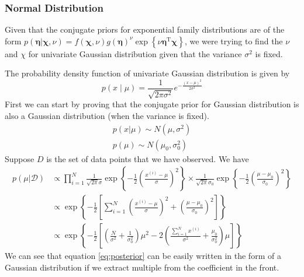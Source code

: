 \documentclass[12pt]{article}
\begin{document}
\subsubsection{Normal Distribution}
Given that the conjugate priors for exponential family distributions are of the form $p(\boldsymbol{\eta} | \boldsymbol{\chi}, \nu)=f(\boldsymbol{\chi}, \nu) g(\boldsymbol{\eta})^{\nu} \exp \left\{\nu \boldsymbol{\eta}^{\mathrm{T}} \boldsymbol{\chi}\right\}$, we were trying to find the $\nu$ and $\chi$ for univariate Gaussian distribution given that the variance $\sigma^2$ is fixed.

The probability density function of univariate Gaussian distribution is given by
\begin{equation}\label{eq:gaussian}
    p(x\mid\mu)=\frac{1}{\sqrt{2 \pi \sigma^{2}}} e^{-\frac{(x-\mu)^{2}}{2 \sigma^{2}}}
\end{equation}
First we can start by proving that the conjugate prior for Gaussian distribution is also a Gaussian distribution (when the variance is fixed).
\begin{displaymath}
\begin{array}{l}{p(x | \mu) \sim N\left(\mu, \sigma^{2}\right)} \\ {p(\mu) \sim N\left(\mu_{0}, \sigma_{0}^{2}\right)}\end{array}
\end{displaymath}
Suppose $D$ is the set of data points that we have observed. We have 
\begin{equation}\label{eq:posterior}
\begin{aligned} p(\mu | \mathcal{D}) &\propto  \prod_{i=1}^{N} \frac{1}{\sqrt{2 \pi} \sigma} \exp \left\{-\frac{1}{2}\left(\frac{x^{(i)}-\mu}{\sigma}\right)^{2}\right\} \times \frac{1}{\sqrt{2 \pi} \sigma_{0}} \exp \left\{-\frac{1}{2}\left(\frac{\mu-\mu_{0}}{\sigma_{0}}\right)^{2}\right\} \\ &\propto \exp \left\{-\frac{1}{2}\left[\sum_{i=1}^{N}\left(\frac{x^{(i)}-\mu}{\sigma}\right)^{2}+\left(\frac{\mu-\mu_{0}}{\sigma_{0}}\right)^{2}\right]\right\} \\ &\propto \exp \left\{-\frac{1}{2}\left[\left(\frac{N}{\sigma^{2}}+\frac{1}{\sigma_{0}^{2}}\right) \mu^{2}-2\left(\frac{\sum_{i=1}^{N} x^{(i)}}{\sigma^{2}}+\frac{\mu_{0}}{\sigma_{0}^{2}}\right) \mu\right]\right\} \end{aligned}
\end{equation}
We can see that equation \ref{eq:posterior} can be easily written in the form of a Gaussian distribution if we extract multiple from the coefficient in the front. 
\end{document}
